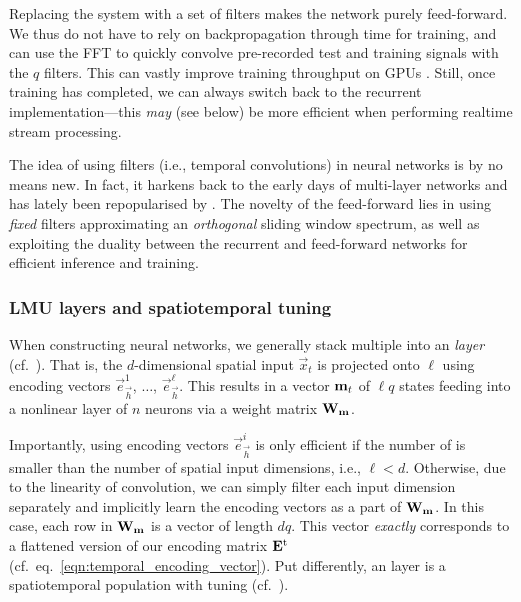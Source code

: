 Replacing the \LTI system with a set of \FIR filters makes the network purely feed-forward.
We thus do not have to rely on backpropagation through time \citep[e.g.,][]{werbos1990backpropagation} for training, and can use the FFT to quickly convolve pre-recorded test and training signals with the $q$ \FIR filters.
This can vastly improve training throughput on GPUs \citep{chilkuri2021parallelizing}.
Still, once training has completed, we can always switch back to the recurrent implementation---this \emph{may} (see below) be more efficient when performing realtime stream processing.

The idea of using \FIR filters (i.e., temporal convolutions) in neural networks is by no means new.
In fact, it harkens back to the early days of multi-layer networks \citep[e.g.,][]{waibel1989phoneme,back1991fir} and has lately been repopularised by \citet{bai2018empirical}.
The novelty of the feed-forward \LMU lies in using \emph{fixed} \FIR filters approximating an \emph{orthogonal} sliding window spectrum, as well as exploiting the duality between the recurrent and feed-forward networks for efficient inference and training.

\subsubsection{LMU layers and spatiotemporal tuning}
When constructing neural networks, we generally stack multiple \LMUpl into an \emph{\LMU layer} (cf.~).
That is, the $d$-dimensional spatial input $\vec x_t$ is projected onto $\ell$ \LMUpl using encoding vectors $\vec e^1_{\vec h}$, $\ldots$, $\vec e^\ell_{\vec h}$.
This results in a vector $\mathbf{m}_t$ of $\ell q$ states feeding into a nonlinear layer of $n$ neurons via a weight matrix $\mathbf{W}_{\mathbf{m}}$.

Importantly, using encoding vectors $\vec e^i_{\vec h}$ is only efficient if the number of \LMUpl is smaller than the number of spatial input dimensions, i.e., $\ell < d$.
Otherwise, due to the linearity of convolution, we can simply filter each input dimension separately and implicitly learn the encoding vectors as a part of $\mathbf{W}_{\mathbf{m}}$.
In this case, each row in $\mathbf{W}_{\mathbf{m}}$ is a vector of length $d q$.
This vector \emph{exactly} corresponds to a flattened version of our encoding matrix $\mathbf{E}^\mathrm{t}$ (cf.~eq.~\ref{eqn:temporal_encoding_vector}).
Put differently, an \LMU layer is a spatiotemporal \NEF population with \LDN tuning (cf.~).

